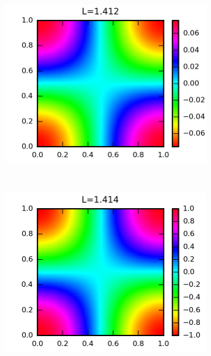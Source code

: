 \begin{figure}
  \centering
  \begin{subfigure}{0.4\textwidth}
    \centering
    \includegraphics{figuras/modonum_3.png}
  \end{subfigure}
  ~
  \begin{subfigure}{0.4\textwidth}
    \centering
    \includegraphics{figuras/modoanalitico_1_1.png}
  \end{subfigure}
  

\end{figure}
